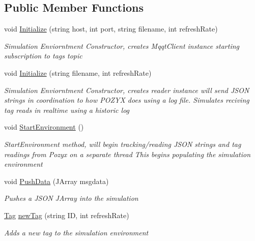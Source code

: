 \subsection*{Public Member Functions}
\begin{DoxyCompactItemize}
\item 
void \hyperlink{class_pozyx_positioner_1_1_framework_1_1_sim_environment_ad559e17b83e87b9121d3ffd9c08e10b4}{Initialize} (string host, int port, string filename, int refresh\+Rate)
\begin{DoxyCompactList}\small\item\em Simulation Enviorntment Constructor, creates Mqqt\+Client instance starting subscription to tags topic \end{DoxyCompactList}\item 
void \hyperlink{class_pozyx_positioner_1_1_framework_1_1_sim_environment_a7ede2b3fa6a7af26549b316f1649ba21}{Initialize} (string filename, int refresh\+Rate)
\begin{DoxyCompactList}\small\item\em Simulation Enviorntment Constructor, creates reader instance will send J\+S\+ON strings in coordination to how P\+O\+Z\+YX does using a log file. Simulates reciving tag reads in realtime using a historic log \end{DoxyCompactList}\item 
void \hyperlink{class_pozyx_positioner_1_1_framework_1_1_sim_environment_a0d114a29811d19d1376273cb078f6f61}{Start\+Environment} ()
\begin{DoxyCompactList}\small\item\em Start\+Environment method, will begin tracking/reading J\+S\+ON strings and tag readings from Pozyx on a separate thread This begins populating the simulation environment \end{DoxyCompactList}\item 
void \hyperlink{class_pozyx_positioner_1_1_framework_1_1_sim_environment_a94e341475ddb03c2c27dd253748ad65a}{Push\+Data} (J\+Array msgdata)
\begin{DoxyCompactList}\small\item\em Pushes a J\+S\+ON J\+Array into the simulation \end{DoxyCompactList}\item 
\hyperlink{class_pozyx_positioner_1_1_framework_1_1_tag}{Tag} \hyperlink{class_pozyx_positioner_1_1_framework_1_1_sim_environment_ad523ae9a258ae7b68d7f966be92ff3bb}{new\+Tag} (string ID, int refresh\+Rate)
\begin{DoxyCompactList}\small\item\em Adds a new tag to the simulation environment \end{DoxyCompactList}\item 

\end{DoxyCompactItemize}
